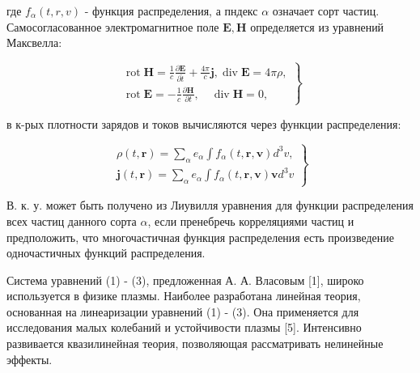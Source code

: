 \documentclass[10pt]{article}
\begin{document}
где $f_{\alpha}(t, r, v)$ - функция распределения, а пндекс $\alpha$ означает сорт частиц. Самосогласованное электромагнитное поле $\boldsymbol{E}, \boldsymbol{H}$ определяется из уравнений Максвелла:



\[

\left.\begin{array}{l}

\operatorname{rot} \boldsymbol{H}=\frac{1}{c} \frac{\partial \boldsymbol{E}}{\partial \hat{t}}+\frac{4 \pi}{c} \boldsymbol{j}, \operatorname{div} \boldsymbol{E}=4 \pi \rho, \\

\operatorname{rot} \boldsymbol{E}=-\frac{1}{c} \frac{\partial \boldsymbol{H}}{\partial t}, \quad \operatorname{div} \boldsymbol{H}=0,

\end{array}\right\}

\]



в к-рых плотности зарядов и токов вычисляются через функции распределения:



\[

\left.\begin{array}{l}

\rho(t, \boldsymbol{r})=\sum_{\alpha} e_{\alpha} \int f_{\alpha}(t, \boldsymbol{r}, \boldsymbol{v}) d^{3} v, \\

\boldsymbol{j}(t, \boldsymbol{r})=\sum_{\alpha} e_{\alpha} \int f_{\alpha}(t, \boldsymbol{r}, \boldsymbol{v}) \boldsymbol{v} d^{3} v

\end{array}\right\}

\]



В. к. у. может быть получено из Лиувилля уравнения для функции распределения всех частиц данного сорта $\alpha$, если пренебречь корреляциями частиц и предположить, что многочастичная функция распределения есть произведение одночастичных функций распределения.



Система уравнений (1) - (3), предложенная А. А. Власовым [1], широко используется в физике плазмы. Наиболее разработана линейная теория, основанная на линеаризации уравнений (1) - (3). Она применяется для исследования малых колебаний и устойчивости плазмы [5]. Интенсивно развивается квазилинейная теория, позволяющая рассматривать нелинейные эффекты.
\end{document}
